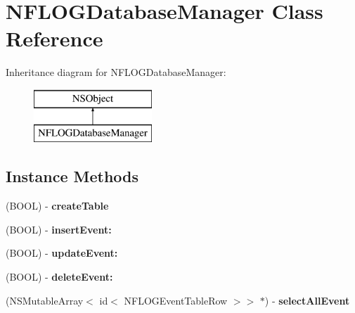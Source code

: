 \hypertarget{interface_n_f_l_o_g_database_manager}{}\section{N\+F\+L\+O\+G\+Database\+Manager Class Reference}
\label{interface_n_f_l_o_g_database_manager}
Inheritance diagram for N\+F\+L\+O\+G\+Database\+Manager\+:\begin{figure}[H]
\begin{center}
\leavevmode
\includegraphics[height=2.000000cm]{interface_n_f_l_o_g_database_manager}
\end{center}
\end{figure}
\subsection*{Instance Methods}
\begin{DoxyCompactItemize}
\item 
\mbox{\label{interface_n_f_l_o_g_database_manager_a7e15bd9e71611889693d5d76564f5569}} 
(B\+O\+OL) -\/ {\bfseries create\+Table}
\item 
\mbox{\label{interface_n_f_l_o_g_database_manager_a1c26d05a773d01af4342cef1c5112f06}} 
(B\+O\+OL) -\/ {\bfseries insert\+Event\+:}
\item 
\mbox{\label{interface_n_f_l_o_g_database_manager_a79ff4b36125958d5552b7ae780437557}} 
(B\+O\+OL) -\/ {\bfseries update\+Event\+:}
\item 
\mbox{\label{interface_n_f_l_o_g_database_manager_a0e91938877e0300601a96bf34231eb2c}} 
(B\+O\+OL) -\/ {\bfseries delete\+Event\+:}
\item 
\mbox{\label{interface_n_f_l_o_g_database_manager_a3a6c4da285f4a305700bce008d82c288}} 
(N\+S\+Mutable\+Array$<$ id$<$ N\+F\+L\+O\+G\+Event\+Table\+Row $>$$>$ $\ast$) -\/ {\bfseries select\+All\+Event}
\end{DoxyCompactItemize}
